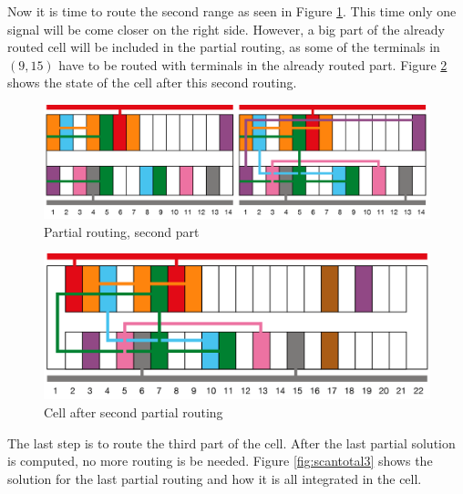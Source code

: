 Now it is time to route the second range as seen in Figure \ref{fig:scanpart2}. This time only one signal will be come closer on the right side. However, a big part of the already routed cell will be included in the partial routing, as some of the terminals in $(9, 15)$ have to be routed with terminals in the already routed part. Figure \ref{fig:scantotal2} shows the state of the cell after this second routing. \\

\begin{figure}[h!]
  \centering
  \includegraphics[scale=0.5]{img/design/scanpart2.png}
  \caption{Partial routing, second part}
  \label{fig:scanpart2}
\end{figure} 

\begin{figure}[h!]
  \centering
  \includegraphics[scale=0.5]{img/design/scantotal2.png}
  \caption{Cell after second partial routing}
  \label{fig:scantotal2}
\end{figure} 

The last step is to route the third part of the cell. After the last partial solution is computed, no more routing is be needed. Figure \ref{fig:scantotal3} shows the solution for the last partial routing and how it is all integrated in the cell. \\

